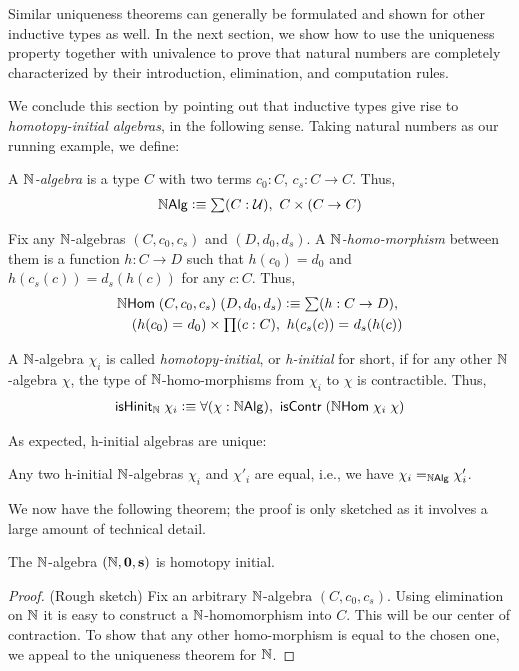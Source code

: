 Similar uniqueness theorems can generally be formulated and shown for other inductive types as well. In the next section, we show how to use the uniqueness property together with univalence to prove that natural numbers are completely characterized by their introduction, elimination, and computation rules.

\medskip

We conclude this section by pointing out that inductive types give rise to \emph{homotopy-initial algebras}, in the following sense. Taking natural numbers as our running example, we define:

\begin{defn}
A \emph{$\nat$-algebra} is a type $C$ with two terms $c_0 : C$, $c_s : C \to C$. Thus,
\begin{align*}
\nalg \defeq \sm {C : \type} C \times (C \to C)
\end{align*}
\end{defn}

\begin{defn}
Fix any $\nat$-algebras $(C,c_0,c_s)$ and $(D,d_0,d_s)$. A \emph{$\nat$-homo-morphism} between them is a function $h : C \to D$ such that $h(c_0) = d_0$ and $h(c_s(c)) = d_s(h(c))$ for any $c : C$. Thus,
\begin{align*}
\nhom \; (C,c_0,c_s) \; (D,d_0,d_s) \defeq \sm {h : C \to D} \\ (\id{h(c_0)}{d_0}) \times \prd{c:C} \id{h(c_s(c))}{d_s(h(c))}
\end{align*}
\end{defn}

\begin{defn}
A $\nat$-algebra $\chi_i$ is called \emph{homotopy-initial}, or \emph{h-initial} for short, if for any other $\nat$-algebra $\chi$, the type of $\nat$-homo-morphisms from $\chi_i$ to $\chi$ is contractible. Thus,
\begin{align*}
\ishinitn \; \chi_i \defeq \fall{\chi : \nalg} \iscontr \; (\nhom \; \chi_i\; \chi)
\end{align*}
\end{defn}

As expected, h-initial algebras are unique:
\begin{thm}
Any two h-initial $\nat$-algebras $\chi_i$ and $\chi'_i$ are equal, i.e., we have $\id[\nalg]{\chi_i}{\chi'_i}$.
\end{thm}

We now have the following theorem; the proof is only sketched as it involves a large amount of technical detail.
\begin{thm}
The $\nat$-algebra $(\nat, \zero, \s)$ is homotopy initial.
\end{thm}
\begin{proof}
(Rough sketch) Fix an arbitrary $\nat$-algebra $(C,c_0,c_s)$. Using elimination on $\nat$ it is easy to construct a $\nat$-homomorphism into $C$. This will be our
center of contraction. To show that any other homo-morphism is equal to the chosen one, we appeal to the uniqueness theorem for $\nat$.
\end{proof}

